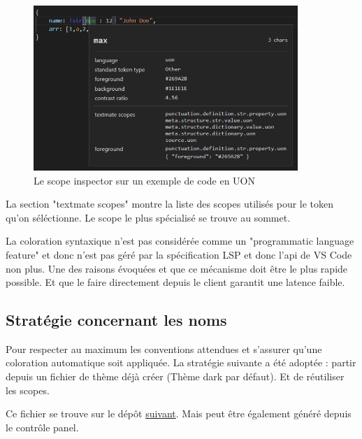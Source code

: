 \documentclass[
    iict, %
    il, %
]{heig-tb}
\begin{document}
\begin{figure}[!h]
    \begin{center}
        \includegraphics[width=10cm]{assets/figures/scope-inspector.png}
    \end{center}
    \caption[Scope inspector]{\label{basic-uon} Le scope inspector sur un exemple de code en UON}
\end{figure}

La section "textmate scopes" montre la liste des scopes utilisés pour le token qu'on séléctionne. Le scope le plus spécialisé se trouve au sommet.

La coloration syntaxique n'est pas considérée comme un "programmatic language feature" et donc n'est pas géré par la spécification LSP et donc l'api de VS Code non plus. Une des raisons évoquées et que ce mécanisme doit être le plus rapide possible. Et que le faire directement depuis le client garantit une latence faible.

\subsection{Stratégie concernant les noms}
Pour respecter au maximum les conventions attendues et s'assurer qu'une coloration automatique soit appliquée. La stratégie suivante a été adoptée : partir depuis un fichier de thème déjà créer (Thème dark par défaut). Et de réutiliser les scopes.

Ce fichier se trouve sur le dépôt \href{https://github.com/microsoft/vscode/blob/main/extensions/theme-defaults/themes/dark_vs.json}{suivant}.
Mais peut être également généré depuis le contrôle panel.
\end{document}
